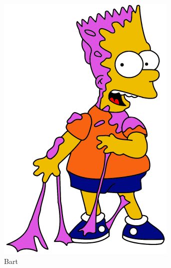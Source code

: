 \documentclass[journal]{IEEEtran}
\begin{document}
\begin{figure}[!htb]
    \centering
    \begin{subfigure}[b]{0.15\textwidth}
        \includegraphics[width=\textwidth]{bart001}
        \caption{Bart}
        \label{fig:bart}
    \end{subfigure}
    ~ %
    \begin{subfigure}[b]{0.15\textwidth}

\end{subfigure}
\end{figure}
\end{document}
